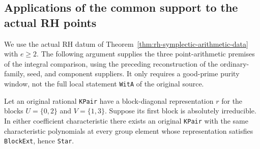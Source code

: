 \subsection{Applications of the common support to the actual RH points}
\label{subsec:rh-four-point-applications}

We use the actual RH datum of
Theorem~\ref{thm:rh-symplectic-arithmetic-data} with $e\geq2$.
The following argument supplies the three point-arithmetic
premises of the integral comparison, using the preceding
reconstruction of the ordinary-family, seed, and component
suppliers. It only requires a good-prime purity window, not
the full local statement \texttt{WitA} of the original source.

\begin{lemma}
\label{lem:rh-four-block-extension}
Let an original rational \texttt{KPair} have a block-diagonal
representation $r$ for the blocks $U=\{0,2\}$ and $V=\{1,3\}$.
Suppose its first block is absolutely irreducible. In either
coefficient characteristic there exists an original \texttt{KPair}
with the same characteristic polynomials at every group element
whose representation satisfies \texttt{BlockExt}, hence
\texttt{Star}.
\end{lemma}

